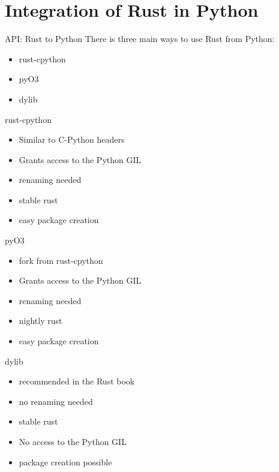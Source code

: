 
\section{Integration of Rust in Python}


\begin{frame}[c]{API: Rust to Python}
    There is three main ways to use Rust from Python:
    \pause
    \begin{itemize}[<+->]
        \item rust-cpython
        \item pyO3
        \item dylib
    \end{itemize}
\end{frame}

\begin{frame}[c]{rust-cpython}
    \begin{itemize}[<+(1)->]
        \item Similar to C-Python headers
        \item Grants access to the Python GIL
        \item renaming needed
        \item stable rust
        \item easy package creation
    \end{itemize}
\end{frame}


\begin{frame}[c]{pyO3}
    \begin{itemize}[<+(1)->]
        \item fork from rust-cpython
        \item Grants access to the Python GIL
        \item renaming needed
        \item nightly rust
        \item easy package creation
    \end{itemize}
\end{frame}


\begin{frame}[c]{dylib}
    \begin{itemize}[<+(1)->]
        \item recommended in the Rust book
        \item no renaming needed
        \item stable rust
        \item No access to the Python GIL
        \item package creation possible
    \end{itemize}
\end{frame}



